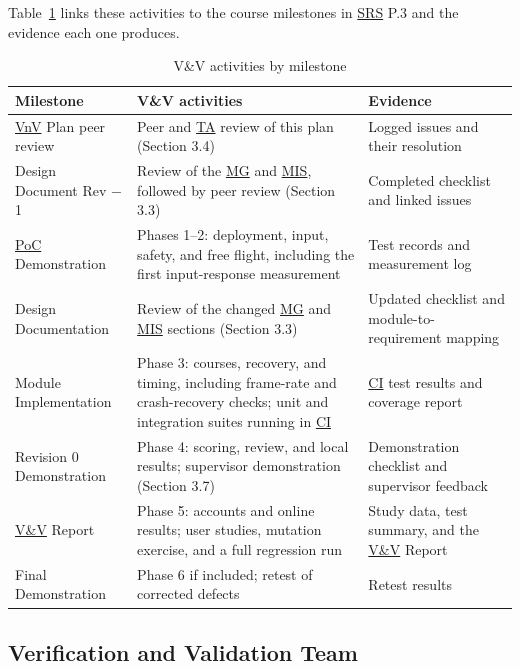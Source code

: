 \documentclass[12pt, titlepage]{article}
\begin{document}
Table~\ref{tab:vnv-schedule} links these activities to the course milestones in \hyperlink{abbr:SRS}{SRS} P.3
and the evidence each one produces.

\begin{table}[!htbp]
\centering
\caption{V\&V activities by milestone}
\label{tab:vnv-schedule}
\renewcommand{\arraystretch}{1.15}
\begin{tabularx}{\textwidth}{@{}>{\raggedright\arraybackslash}p{}>{\raggedright\arraybackslash}X>{\raggedright\arraybackslash}p{}@{}}
\toprule
\textbf{Milestone} &
\textbf{V\&V activities} &
\textbf{Evidence} \\
\midrule
\hyperlink{abbr:VnV}{VnV} Plan peer review &
Peer and \hyperlink{abbr:TA}{TA} review of this plan (Section 3.4) &
Logged issues and their resolution \\
Design Document Rev \(-\)1 &
Review of the \hyperlink{abbr:MG}{MG} and \hyperlink{abbr:MIS}{MIS}, followed by peer review (Section 3.3) &
Completed checklist and linked issues \\
\hyperlink{abbr:PoC}{PoC} Demonstration &
Phases 1--2: deployment, input, safety, and free flight, including the first
input-response measurement &
Test records and measurement log \\
Design Documentation &
Review of the changed \hyperlink{abbr:MG}{MG} and \hyperlink{abbr:MIS}{MIS} sections (Section 3.3) &
Updated checklist and module-to-requirement mapping \\
Module Implementation &
Phase 3: courses, recovery, and timing, including frame-rate and crash-recovery checks;
unit and integration suites running in \hyperlink{abbr:CI}{CI} &
\hyperlink{abbr:CI}{CI} test results and coverage report \\
Revision 0 Demonstration &
Phase 4: scoring, review, and local results; supervisor demonstration (Section 3.7) &
Demonstration checklist and supervisor feedback \\
\hyperlink{abbr:VnV}{V\&V} Report &
Phase 5: accounts and online results; user studies, mutation exercise, and a full
regression run &
Study data, test summary, and the \hyperlink{abbr:VnV}{V\&V} Report \\
Final Demonstration &
Phase 6 if included; retest of corrected defects &
Retest results \\
\bottomrule
\end{tabularx}
\end{table}

\subsection{Verification and Validation Team}
\end{document}
